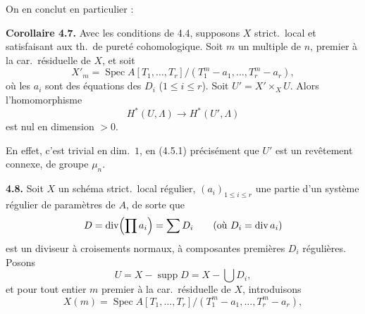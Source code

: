 \documentclass[11pt,a4paper]{article}
\begin{document}
On en conclut en particulier :


\textbf{Corollaire 4.7.} Avec les conditions de 4.4, supposons $X$  strict.\ local et satisfaisant aux  th.\ de pureté cohomologique. Soit $m$ un  multiple de $n$, premier à la car.\ résiduelle de $X$, et soit
\[
X'_m = \operatorname{Spec} A[T_1, \ldots, T_r]/(T_1^m - a_1, \ldots, T_r^m - a_r) ,
\]
où les $a_i$ sont des équations  des $D_i$ ($1 \leq i \leq r$). Soit $U' = X' \times_X U$. Alors l'homomorphisme 
\[
H^*(U, \Lambda) \longrightarrow H^*(U', \Lambda)
\]
est nul en dimension $> 0$.

En effet, c'est trivial en dim.\ $1$, en  (4.5.1) \struck{\ill{}} \struck{\ill{}}  précisément  que $U'$ est un revêtement  connexe, de groupe $\mu_n$.


\textbf{4.8.} Soit $X$  un schéma strict.\ local régulier, $(a_i)_{1 \leq i \leq r}$ une partie d'un système régulier de paramètres de $A$, de sorte que 
\[
D = \operatorname{div}\Bigl(\prod a_i\Bigr) = \sum D_i \qquad (\text{où } D_i = \operatorname{div} a_i)
\]
est un diviseur à croisements normaux, à composantes premières $D_i$ régulières. Posons
\[
U = X - \operatorname{supp} D = X - \bigcup D_i ,
\]
et pour tout entier $m$ premier à la car.\ résiduelle de $X$, introduisons
\[
X(m) = \operatorname{Spec} A[T_1, \ldots, T_r]/(T_1^m - a_1, \ldots, T_r^m - a_r) ,
\]

\end{document}
